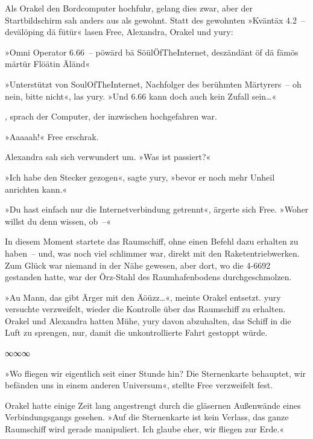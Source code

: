 Als Orakel den Bordcomputer hochfuhr, gelang dies zwar, aber der Startbildschirm sah anders aus als gewohnt. Statt des gewohnten »Kväntäx 4.2~– devälöping dä fütür« lasen Free, Alexandra, Orakel und yury:

»Omni Operator 6.66~– pöwärd bä SöülÖfTheInternet, deszändänt öf dä fämös märtür Flöätin Äländ«

»Unterstützt von SoulOfTheInternet, Nachfolger des berühmten Märtyrers~– oh nein, bitte nicht«, las yury. »Und 6.66 kann doch auch kein Zufall sein…«

, sprach der Computer, der inzwischen hochgefahren war.

»Aaaaah!« Free erschrak.


Alexandra sah sich verwundert um. »Was ist passiert?«

»Ich habe den Stecker gezogen«, sagte yury, »bevor er noch mehr Unheil anrichten kann.«

»Du hast einfach nur die Internetverbindung getrennt«, ärgerte sich Free. »Woher willst du denn wissen, ob~–«

In diesem Moment startete das Raumschiff, ohne einen Befehl dazu erhalten zu haben~– und, was noch viel schlimmer war, direkt mit den Raketentriebwerken. Zum Glück war niemand in der Nähe gewesen, aber dort, wo die 4-6692 gestanden hatte, war der Örz-Stahl des Raumhafenbodens durchgeschmolzen.

»Au Mann, das gibt Ärger mit den Äöüzz…«, meinte Orakel entsetzt. yury versuchte verzweifelt, wieder die Kontrolle über das Raumschiff zu erhalten. Orakel und Alexandra hatten Mühe, yury davon abzuhalten, das Schiff in die Luft zu sprengen, nur, damit die unkontrollierte Fahrt gestoppt würde.

\begin{center}
    ∞∞∞
\end{center}

»Wo fliegen wir eigentlich seit einer Stunde hin? Die Sternenkarte behauptet, wir befänden uns in einem anderen Universum«, stellte Free verzweifelt fest.

Orakel hatte einige Zeit lang angestrengt durch die gläsernen Außenwände eines Verbindungsgangs gesehen. »Auf die Sternenkarte ist kein Verlass, das ganze Raumschiff wird gerade manipuliert. Ich glaube eher, wir fliegen zur Erde.«

